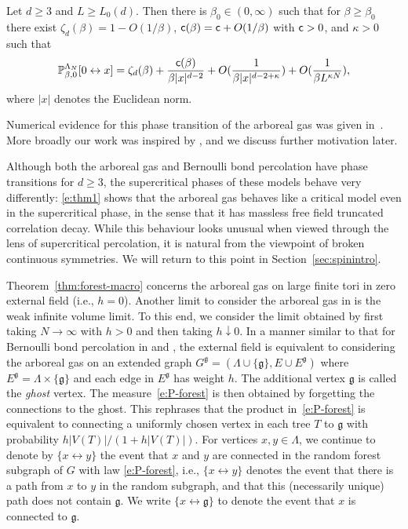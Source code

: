 \documentclass[11pt]{amsart}
\numberwithin{equation}{section}
\numberwithin{theorem}{section}
\newcommand{\ghost}{\mathfrak{g}}
\newcommand{\conn}{\leftrightarrow}
\newcommand{\1}{{\bf 1}}
\newcommand{\consto}{{\sf c}}
\begin{document}
\begin{theorem}  \label{thm:forest-macro}
  Let $d\geq 3$ and $L \geq L_0(d)$. Then there is
  $\beta_0 \in (0,\infty)$ such that
  for $\beta\geq \beta_0$
  there exist $\zeta_d(\beta) = 1-O(1/\beta)$,
  $\consto(\beta) = \consto + O(1/\beta)$ with $\consto>0$, and
  $\kappa>0$ such that 
  \begin{equation}
    \label{e:thm1}
    \P_{\beta,0}^{\Lambda_N}[0\conn x]
      = \zeta_d(\beta) + \frac{\consto(\beta)}{\beta|x|^{d-2}} +  O(\frac{1}{\beta|x|^{d-2+\kappa}}) + O(\frac{1}{\beta L^{\kappa N}}),
  \end{equation}
  where $|x|$ denotes the Euclidean norm.
\end{theorem}
Numerical evidence for this phase transition of the arboreal gas was
given in~\cite{PhysRevLett.98.030602}. More broadly our work was
inspired by
\cite{MR2110547,MR3622573,MR2567041,PhysRevLett.98.030602,MR2157859,MR2142209},
and we discuss further motivation later.

Although both the arboreal gas and Bernoulli bond percolation have
phase transitions for $d\geq 3$, the supercritical phases of these
models behave very differently: \eqref{e:thm1} shows that the arboreal
gas behaves like a critical model even in the supercritical phase, in
the sense that it has massless free field truncated correlation
decay. While this behaviour looks unusual when viewed through the lens
of supercritical percolation, it is natural from the viewpoint of
broken continuous symmetries.  We will return to this point in
Section~\ref{sec:spinintro}.

Theorem~\ref{thm:forest-macro} concerns the arboreal gas on large
finite tori in zero external field (i.e., $h=0$).  Another
limit to consider the arboreal gas in is the weak infinite volume
limit.  To this end, we consider the limit obtained by first taking
$N\to\infty$ with $h>0$ and then taking $h\downarrow 0$.  In a manner
similar to that for Bernoulli bond percolation in
\cite[Section~5]{MR378660} and \cite[Section~2.2]{MR874906}, the
external field is equivalent to considering the arboreal gas on an
extended graph
$G^{\ghost} = (\Lambda\cup\{\ghost\}, E\cup E^{\ghost})$ where
$E^{\ghost} = \Lambda\times\{\ghost\}$ and each edge in $E^{\ghost}$
has weight $h$. The additional vertex $\ghost$ is called the
\emph{ghost} vertex. The measure~\eqref{e:P-forest} is then obtained
by forgetting the connections to the ghost. This rephrases that the
product in~\eqref{e:P-forest} is equivalent to connecting a uniformly
chosen vertex in each tree $T$ to $\ghost$ with probability
$h|V(T)|/(1+h|V(T)|)$.  For vertices $x,y \in \Lambda$, we continue to
denote by $\{x\conn y\}$ the event that $x$ and $y$ are connected in
the random forest subgraph of $G$ with law \eqref{e:P-forest}, i.e.,
$\{x\conn y\}$ denotes the event that there is a path from $x$
to $y$ in the random subgraph, and that this (necessarily unique)
path does not contain $\ghost$. We write $\{x\conn \ghost\}$ to
denote the event that $x$ is connected to $\ghost$.
\end{document}
